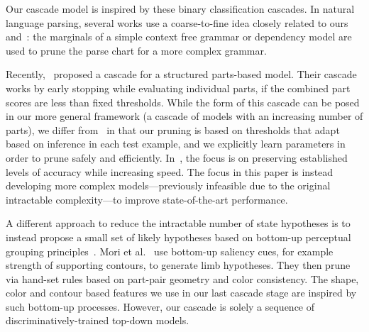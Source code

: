Our cascade model is inspired by these binary classification cascades. In 
natural language parsing, several works \citep{carreras2008tag,petrov:PhD} use 
a coarse-to-fine idea closely related to ours and~\citet{geman2001}: the 
marginals of a simple context free grammar or dependency model are used to 
prune the parse chart for a more complex grammar.

Recently,~\citet{pff-cascade} proposed a cascade for a structured parts-based 
model.  Their cascade works by early stopping while evaluating individual 
parts, if the combined part scores are less than fixed thresholds.  While the 
form of this cascade can be posed in our more general framework (a cascade of 
models with an increasing number of parts), we differ from~\citet{pff-cascade} 
in that our pruning is based on thresholds that adapt based on inference in 
each test example, and we explicitly learn parameters in order to prune safely 
and efficiently. In~\citet{geman2001,viola02,pff-cascade}, the focus is on 
preserving established levels of accuracy while increasing speed.  The focus in 
this paper is instead developing more complex models---previously infeasible 
due to the original intractable complexity---to improve state-of-the-art 
performance.

A different approach to reduce the intractable number of state hypotheses is to 
instead propose a small set of likely hypotheses based on bottom-up perceptual 
grouping principles~\cite{mori04,praveen07}.  Mori et al.~\cite{mori04} use 
bottom-up saliency cues, for example strength of supporting contours, to 
generate limb hypotheses.  They then prune via hand-set rules based on 
part-pair geometry and color consistency. The shape, color and contour based 
features we use in our last cascade stage are inspired by such bottom-up 
processes.  However, our cascade is solely a sequence of 
discriminatively-trained top-down models.



